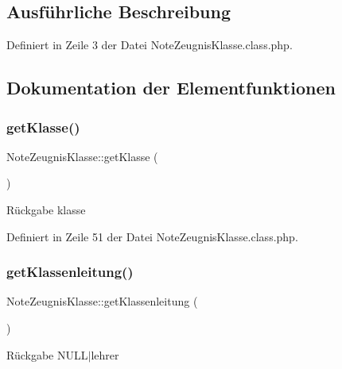 \subsection{Ausführliche Beschreibung}


Definiert in Zeile 3 der Datei Note\+Zeugnis\+Klasse.\+class.\+php.



\subsection{Dokumentation der Elementfunktionen}
\mbox{\label{class_note_zeugnis_klasse_ac08441eb03c85f1920cff42ae67d2606}} 
\subsubsection{\texorpdfstring{get\+Klasse()}{getKlasse()}}
{\footnotesize\ttfamily Note\+Zeugnis\+Klasse\+::get\+Klasse (\begin{DoxyParamCaption}{ }\end{DoxyParamCaption})}

\begin{DoxyReturn}{Rückgabe}
klasse 
\end{DoxyReturn}


Definiert in Zeile 51 der Datei Note\+Zeugnis\+Klasse.\+class.\+php.

\mbox{\label{class_note_zeugnis_klasse_a2cf6fe637934f3f0da6df0b4e7079f04}} 
\subsubsection{\texorpdfstring{get\+Klassenleitung()}{getKlassenleitung()}}
{\footnotesize\ttfamily Note\+Zeugnis\+Klasse\+::get\+Klassenleitung (\begin{DoxyParamCaption}{ }\end{DoxyParamCaption})}

\begin{DoxyReturn}{Rückgabe}
N\+U\+L\+L$\vert$lehrer 
\end{DoxyReturn}


